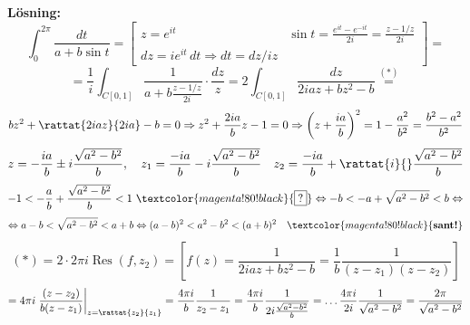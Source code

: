 \textbf{Lösning:}
\[ \int_0^{2\pi} \frac{dt}{a + b\sin t} = \left[ \begin{array}{ll} z = e^{it} & \sin t = \frac{e^{it} - e^{-it}}{2i} = \frac{z - 1/z}{2i} \\ dz = ie^{it}\,dt \Rightarrow dt = dz/iz \end{array} \right] = \]
\[ = \frac{1}{i} \int_{C[0, 1]} \frac{1}{a + b\frac{z - 1/z}{2i}} \cdot \frac{dz}{z} = 2\int_{C[0, 1]} \frac{dz}{2iaz + bz^2 - b} \overset{(*)}{=} \]
\[ bz^2 + \rattat{2iaz}{2ia} - b = 0 \Rightarrow z^2 + \frac{2ia}{b}z - 1 = 0 \Rightarrow \left( z + \frac{ia}{b} \right)^2 = 1 - \frac{a^2}{b^2} = \frac{b^2 - a^2}{b^2} \]
\[ z = -\frac{ia}{b} \pm i\frac{\sqrt{a^2 - b^2}}{b}, \quad z_1 = \frac{-ia}{b} - i\frac{\sqrt{a^2 - b^2}}{b} \quad z_2 = \frac{-ia}{b} + \rattat{i}{}\frac{\sqrt{a^2 - b^2}}{b} \]
\[ -1 < -\frac{a}{b} + \frac{\sqrt{a^2 - b^2}}{b} < 1 \ \textcolor{magenta!80!black}{\fbox{?}} \Leftrightarrow -b < -a + \sqrt{a^2 - b^2} < b \Leftrightarrow \]
\[ \Leftrightarrow a - b < \sqrt{a^2 - b^2} < a + b \Leftrightarrow (a - b)^2 < a^2 - b^2 < (a + b)^2 \quad \textcolor{magenta!80!black}{\textbf{sant!}} \]
\[ (*) = 2 \cdot 2\pi i \operatorname{Res}(f, z_2) = \left[ f(z) = \frac{1}{2iaz + bz^2 - b} = \frac{1}{b} \frac{1}{(z - z_1)(z - z_2)} \right] \]
\[ = 4\pi i \left. \frac{(z - z_2)}{b(z - z_1)} \right|_{z = \rattat{z_2}{z_1}} = \frac{4\pi i}{b} \frac{1}{z_2 - z_1} = \frac{4\pi i}{b} \frac{1}{2i\frac{\sqrt{a^2 - b^2}}{b}} = \dots \frac{4\pi i}{2i} \frac{1}{\sqrt{a^2 - b^2}} = \frac{2\pi}{\sqrt{a^2 - b^2}} \]
